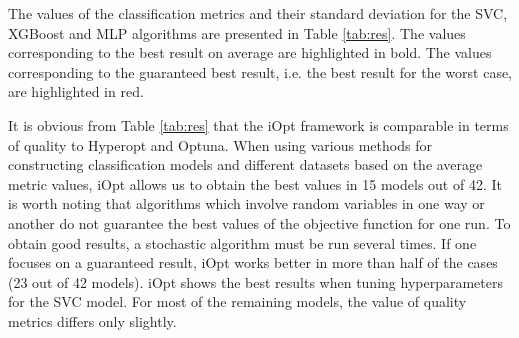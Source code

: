 \documentclass[iicol]{sn-jnl}
\theoremstyle{thmstyleone}%
\theoremstyle{thmstyletwo}%
\theoremstyle{thmstylethree}%
\begin{document}
The values of the classification metrics and their standard deviation for the SVC, XGBoost and MLP algorithms are presented in Table \ref{tab:res}. 
The values corresponding to the best result on average are highlighted in bold. The values corresponding to the guaranteed best result, i.e. the best result for the worst case, are highlighted in red.

It is obvious from Table \ref{tab:res} that the iOpt framework is comparable in terms of quality to Hyperopt and Optuna. When using various methods for constructing classification models and different datasets based on the average metric values, iOpt allows us to obtain the best values in 15 models out of 42. 
It is worth noting that algorithms which involve random variables in one way or another do not guarantee the best values of the objective function for one run. To obtain good results, a stochastic algorithm must be run several times.
If one focuses on a guaranteed result, iOpt works better in more than half of the cases (23 out of 42 models). iOpt shows the best results when tuning hyperparameters for the SVC model. For most of the remaining models, the value of quality metrics differs only slightly. 
\end{document}

